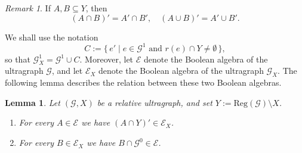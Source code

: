 \documentclass[12pt, reqno]{amsart}
\newtheorem{lemma}[theorem]{Lemma}
\theoremstyle{definition}
\theoremstyle{remark}
\newtheorem{remark}[theorem]{Remark}
\numberwithin{equation}{section}
\begin{document}
\begin{remark}
If $A,B \subseteq Y$, then 
\[
(A \cap B)' = A' \cap B',
\quad 
(A \cup B)' = A' \cup B'.
\]
\end{remark}

We shall use the notation
\[
C := \{\, e' \mid e \in \mathcal{G}^1 \text{ and } r(e) \cap Y \neq \emptyset \,\},
\]
so that $\mathcal{G}_X^1 = \mathcal{G}^1 \cup C$.  
Moreover, let $\mathcal{E}$ denote the Boolean algebra of the ultragraph $\mathcal{G}$, and let $\mathcal{E}_X$ denote the Boolean algebra of the ultragraph $\mathcal{G}_X$.  
The following lemma describes the relation between these two Boolean algebras.





\begin{lemma}
Let $(\mathcal{G}, X)$ be a relative ultragraph, and set $Y := \mathrm{Reg}(\mathcal{G}) \setminus X$.
\begin{enumerate}
    \item For every $A \in \mathcal{E}$ we have $(A \cap Y)' \in \mathcal{E}_X$.
    \item For every $B \in \mathcal{E}_X$ we have $B \cap \mathcal{G}^0 \in \mathcal{E}$.
\end{enumerate}
\end{lemma}
\end{document}
